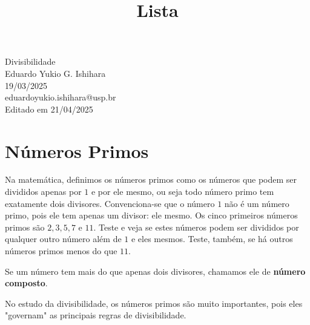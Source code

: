 \documentclass[12pt]{report}
\title{Lista}
\newcommand{\1}{\faThermometerEmpty}
\newcommand{\2}{\faThermometerQuarter}
\newcommand{\3}{\faThermometerHalf}
\newcommand{\4}{\faThermometerThreeQuarters}
\newcommand{\5}{\faThermometerFull}
\begin{document}
\begin{center}
{\Large Divisibilidade} \\ %
\vspace{1mm}
Eduardo Yukio G. Ishihara \\ 19/03/2025 \\ %
{\footnotesize eduardoyukio.ishihara@usp.br \\
Editado em 21/04/2025} %
\end{center}
\vspace{5mm}

\section*{Números Primos}
Na matemática, definimos os números primos como os números que podem ser divididos apenas por $1$ e por ele mesmo, ou seja todo número primo tem exatamente dois divisores. Convenciona-se que o número $1$ não é um número primo, pois ele tem apenas um divisor: ele mesmo. Os cinco primeiros números primos são $2,3,5,7$ e $11$. Teste e veja se estes números podem ser divididos por qualquer outro número além de $1$ e eles mesmos. Teste, também, se há outros números primos menos do que $11$.

Se um número tem mais do que apenas dois divisores, chamamos ele de \textbf{número composto}. 

No estudo da divisibilidade, os números primos são muito importantes, pois eles "governam" as principais regras de divisibilidade.
\end{document}
